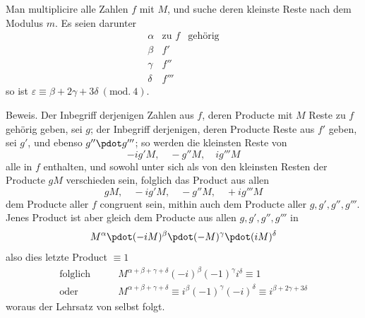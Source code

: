 Man multiplicire alle Zahlen $f$ mit $M$, und suche deren kleinste Reste nach dem Modulus $m$. Es seien darunter
\[
\begin{array}{cll}
\alpha&\text{zu }f&\text{gehörig}\\
\beta&f'&\\
\gamma&f''&\\
\delta&f'''&
\end{array}
\]
so ist $\varepsilon\equiv\beta+2\gamma+3\delta\ (\mathrm{mod.}\ 4)$.

Beweis. Der Inbegriff derjenigen Zahlen aus $f$, deren Producte mit $M$ Reste zu $f$ gehörig geben, sei $g$; der Inbegriff derjenigen, deren Producte Reste aus $f'$ geben, sei $g'$, und ebenso $g''\pdot g'''$; so werden die kleinsten Reste von
\[
-ig'M,\quad -g''M,\quad ig'''M
\]
alle in $f$ enthalten, und sowohl unter sich als von den kleinsten Resten der Producte $gM$ verschieden sein, folglich das Product aus allen
\[
gM,\quad -ig'M,\quad -g''M,\quad +ig'''M
\]
dem Producte aller $f$ congruent sein, mithin auch dem Producte aller $g,g',g'',g'''$. Jenes Product ist aber gleich dem Producte aus allen $g,g',g'',g'''$ in
\[
M^{\alpha}\pdot(-iM)^{\beta}\pdot(-M)^{\gamma}\pdot(iM)^{\delta}
\]
also dies letzte Product $\equiv1$
\[
\begin{aligned}
\text{folglich}\qquad&M^{\alpha+\beta+\gamma+\delta}(-i)^{\beta}(-1)^{\gamma}i^{\delta}\equiv1\\
\text{oder}\qquad&M^{\alpha+\beta+\gamma+\delta}\equiv i^{\beta}(-1)^{\gamma}(-i)^{\delta}\equiv i^{\beta+2\gamma+3\delta}
\end{aligned}
\]
woraus der Lehrsatz von selbst folgt.

